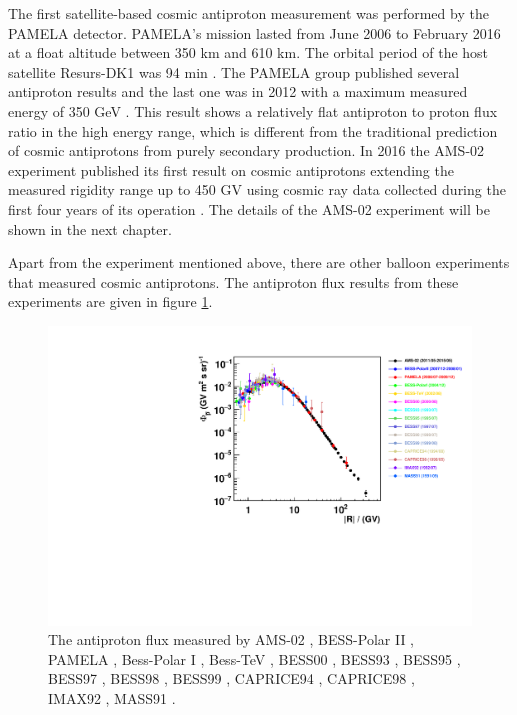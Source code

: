 The first satellite-based cosmic antiproton measurement was performed by the PAMELA detector. PAMELA's mission lasted from June 2006 to February 2016 at a float altitude between 350 km and 610 km. The orbital period of the host satellite Resurs-DK1 was 94 min \cite{PamelaExperiment}. The PAMELA group published several antiproton results and the last one was in 2012 \cite{PamelaAntiproton100Paper, PamelaAntiproton180Paper, PamelaAntiproton350Paper} with a maximum measured energy of 350 GeV \cite{PamelaAntiproton350Paper}. This result shows a relatively flat antiproton to proton flux ratio in the high energy range, which is different from the traditional prediction of cosmic antiprotons from purely secondary production. In 2016 the AMS-02 experiment published its first result on cosmic antiprotons extending the measured rigidity range up to 450 GV using cosmic ray data collected during the first four years of its operation \cite{AMS02AntiprotonPRL2016}. The details of the AMS-02 experiment will be shown in the next chapter. \par

Apart from the experiment mentioned above, there are other balloon experiments that measured cosmic antiprotons. The antiproton flux results from these experiments are given in figure \ref{PbarFluxForDifferentExperiments}.  

\begin{figure}[h]
\centering
\includegraphics[width=1.0\textwidth, height=0.47\textheight]{Figures/chapter2/CosmicAntiprotonsMeasurement/PbarFluxForDifferentExperiments.pdf}
\caption[The measured antiproton flux.]{The antiproton flux measured by AMS-02 \cite{AMS02AntiprotonPRL2016}, BESS-Polar II \cite{BESSPolar2AntiprotonPaper}, PAMELA \cite{PamelaAntiproton350Paper}, Bess-Polar I \cite{BESSPolar1AntiprotonPaper}, Bess-TeV \cite{BESSTeV}, BESS00 \cite{BESS00and99}, BESS93 \cite{BESS93}, BESS95 \cite{BESS95}, BESS97 \cite{BESS97}, BESS98 \cite{BESS98}, BESS99 \cite{BESS00and99}, CAPRICE94 \cite{CAPRICE94}, CAPRICE98 \cite{CAPRICE98}, IMAX92 \cite{IMAX92}, MASS91 \cite{MASS91}. }
\label{PbarFluxForDifferentExperiments}
\end{figure}

